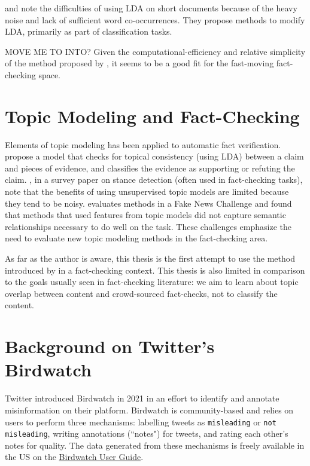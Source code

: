 \documentclass [11pt, proquest] {uwthesis}[2020/02/24]
\begin{document}
 \cite{chen2016short} and \cite{pang2016mr} note the difficulties of using LDA on short documents because of the heavy noise and lack of sufficient word co-occurrences. They propose methods to modify LDA, primarily as part of classification tasks.

MOVE ME TO INTO?
 Given the computational-efficiency and relative simplicity of the method proposed by \cite{sia-etal-2020-tired}, it seems to be a good fit for the fast-moving fact-checking space.

 \section{Topic Modeling and Fact-Checking}
 Elements of topic modeling has been applied to automatic fact verification. \cite{si-etal-2021-topic} propose a model that checks for topical consistency (using LDA) between a claim and pieces of evidence, and classifies the evidence as supporting or refuting the claim. \cite{Hardalov2021ASO}, in a survey paper on stance detection (often used in fact-checking tasks),  note that the benefits of using unsupervised topic models are limited because they tend to be noisy. \cite{hanselowski-etal-2018-retrospective} evaluates methods in a Fake News Challenge and found that methods that used features from topic models did not capture semantic relationships necessary to do well on the task. These challenges emphasize the need to evaluate new topic modeling methods in the fact-checking area.

 As far as the author is aware, this thesis is the first attempt to use the method introduced by \cite{sia-etal-2020-tired} in a fact-checking context. This thesis is also limited in comparison to the goals usually seen in fact-checking literature: we aim to learn about topic overlap between content and crowd-sourced fact-checks, not to classify the content.

 \section{Background on Twitter's Birdwatch}

Twitter introduced Birdwatch in 2021 \citep{coleman_2021} in an effort to identify and annotate misinformation on their platform. Birdwatch is community-based and relies on users to perform three mechanisms: labelling tweets as \verb|misleading| or \verb|not misleading|, writing annotations (``notes") for tweets, and rating each other's notes for quality. The data generated from these mechanisms is freely available in the US on the \href{https://twitter.github.io/birdwatch/}{Birdwatch User Guide}.
\end{document}

